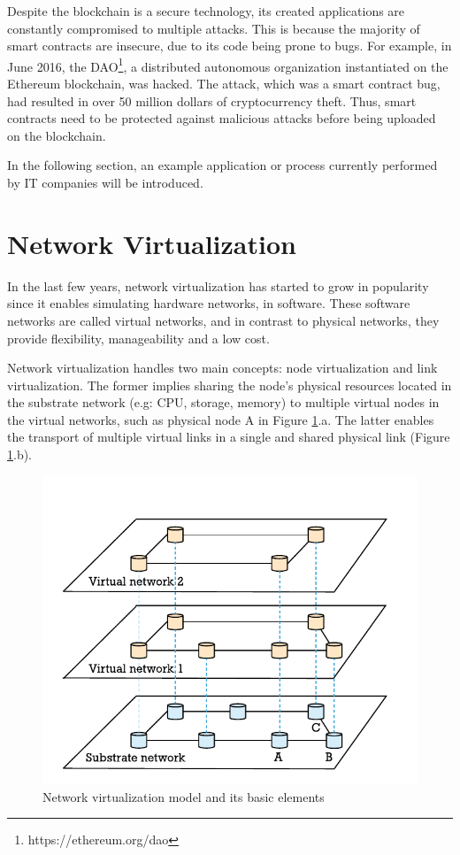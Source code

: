 Despite the blockchain is a secure technology, its created applications are constantly compromised to multiple attacks. This is because the majority of smart contracts are insecure, due to its code being prone to bugs.
For example, in June 2016, the DAO\footnote{https://ethereum.org/dao}, a distributed autonomous organization instantiated on the Ethereum blockchain, was hacked. The attack, which was a smart contract bug, had resulted in over 50 million dollars of cryptocurrency theft. Thus, smart contracts need to be protected against malicious attacks before being uploaded on the blockchain.

In the following section, an example application or process currently performed by IT companies will be introduced.


\section{Network Virtualization} \label{networkvirtualization}

In the last few years, network virtualization has started to grow in popularity since it enables simulating hardware networks, in software. These software networks are called virtual networks, and in contrast to physical networks, they provide flexibility, manageability and a low cost. 

Network virtualization handles two main concepts: node virtualization and link virtualization. The former implies sharing the node's physical resources located in the substrate network (e.g: CPU, storage, memory) to multiple virtual nodes in the virtual networks, such as physical node A in Figure \ref{fig:networkvir}.a. The latter enables the transport of multiple virtual links in a single and shared physical link (Figure \ref{fig:networkvir}.b).

\begin{figure}[bth]
  \includegraphics[width=1\linewidth]{gfx/networkvir}    
  \caption{Network virtualization model and its basic elements \citep{carapinha2009network}}
  \label{fig:networkvir}
\end{figure}

